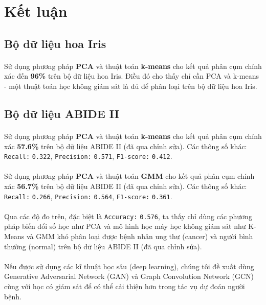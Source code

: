 \newpage
\section{Kết luận}

\subsection{Bộ dữ liệu hoa Iris}

\paragraph{}{Sử dụng phương pháp \textbf{PCA} và thuật toán \textbf{k-means} cho kết quả phân cụm chính xác đến \textbf{96\%} trên bộ dữ liệu hoa Iris. Điều đó cho thấy chỉ cần PCA và k-means - một thuật toán học không giám sát là đủ để phân loại trên bộ dữ liệu hoa Iris.}

\subsection{Bộ dữ liệu ABIDE II}

\paragraph{}{Sử dụng phương pháp \textbf{PCA} và thuật toán \textbf{k-means} cho kết quả phân cụm chính xác \textbf{57.6\%} trên bộ dữ liệu ABIDE II (đã qua chỉnh sửa). Các thông số khác: \texttt{Recall:} \texttt{0.322}, \texttt{Precision:} \texttt{0.571},  \texttt{F1-score:} \texttt{0.412}.}

\paragraph{}{Sử dụng phương pháp \textbf{PCA} và thuật toán \textbf{GMM} cho kết quả phân cụm chính xác \textbf{56.7\%} trên bộ dữ liệu ABIDE II (đã qua chỉnh sửa). Các thông số khác: \texttt{Recall:} \texttt{0.266}, \texttt{Precision:} \texttt{0.564},  \texttt{F1-score:} \texttt{0.361}.}

\paragraph{}{Qua các độ đo trên, đặc biệt là \texttt{Accuracy:} \texttt{0.576}, ta thấy chỉ dùng các phương pháp biến đổi số học như PCA và mô hình học máy học không giám sát như K-Means và GMM khó phân loại được bệnh nhân ung thư (cancer) và người bình thường (normal) trên bộ dữ liệu ABIDE II (đã qua chỉnh sửa).}

\paragraph{}{Nếu được sử dụng các kĩ thuật học sâu (deep learning), chúng tôi đề xuất dùng Generative Adversarial Network (GAN) và Graph Convolution Network (GCN) \cite{huynh2024use} cùng với học có giám sát để có thể cải thiện hơn trong tác vụ dự đoán người bệnh.}

\pagebreak
